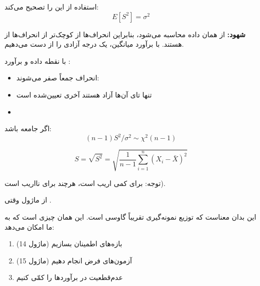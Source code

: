 
استفاده از  این را تصحیح می‌کند:\PSbr{}\[E[S^2] = \sigma^2\]

\textbf{شهود:}  از همان داده محاسبه می‌شود، بنابراین انحراف‌ها از  کوچک‌تر از انحراف‌ها از \lr{\ensuremath{\mu}} هستند. با برآورد میانگین، یک درجه آزادی را از دست می‌دهیم.


با  نقطه داده و برآورد :

\begin{itemize}
\tightlist
\item
   انحراف  جمعاً صفر می‌شوند: 
\item
  تنها  تای آن‌ها آزاد هستند  آخری تعیین‌شده است
\item
\end{itemize}


اگر جامعه  باشد:\PSbr{}\[(n-1)S^2/\sigma^2 \sim \chi^2(n-1)\]


\[S = \sqrt{S^2} = \sqrt{\frac{1}{n-1}\sum_{i=1}^n (X_i - \bar{X})^2}\]

توجه:  برای \lr{\ensuremath{\sigma}} کمی اریب است، هرچند  برای  نااریب است).


از ماژول  وقتی .

این بدان معناست که توزیع نمونه‌گیری  تقریباً گاوسی است. این همان چیزی است که به ما امکان می‌دهد:

\begin{enumerate}
\def\labelenumi{\arabic{enumi}.}
\tightlist
\item
  بازه‌های اطمینان بسازیم (ماژول 14)
\item
  آزمون‌های فرض انجام دهیم (ماژول 15)
\item
  عدم‌قطعیت در برآوردها را کمّی کنیم
\end{enumerate}

